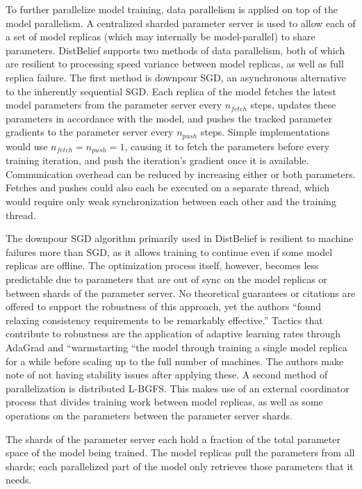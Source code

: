 To further parallelize model training, data parallelism is applied on top of the model parallelism. A centralized sharded parameter server is used to allow each of a set of model replicas (which may internally be model-parallel) to share parameters. DistBelief supports two methods of data parallelism, both of which are resilient to processing speed variance between model replicas, as well as full replica failure. The first method is downpour SGD, an asynchronous alternative to the inherently sequential SGD. Each replica of the model fetches the latest model parameters from the parameter server every $n_{fetch}$ steps, updates these parameters in accordance with the model, and pushes the tracked parameter gradients to the parameter server every $n_{push}$ steps. Simple implementations would use $n_{fetch} = n_{push} = 1$, causing it to fetch the parameters before every training iteration, and push the iteration’s gradient once it is available. Communication overhead can be reduced by increasing either or both parameters. Fetches and pushes could also each be executed on a separate thread, which would require only weak synchronization between each other and the training thread.

The downpour SGD algorithm primarily used in DistBelief is resilient to machine failures more than SGD, as it allows training to continue even if some model replicas are offline. The optimization process itself, however, becomes less predictable due to parameters that are out of sync on the model replicas or between shards of the parameter server. No theoretical guarantees or citations are offered to support the robustness of this approach, yet the authors “found relaxing consistency requirements to be remarkably effective.” Tactics that contribute to robustness are the application of adaptive learning rates through AdaGrad\citep{Duchi2011} and “warmstarting “the model through training a single model replica for a while before scaling up to the full number of machines. The authors make note of not having stability issues after applying these.
A second method of parallelization is distributed L-BGFS. This makes use of an external coordinator process that divides training work between model replicas, as well as some operations on the parameters between the parameter server shards.

The shards of the parameter server each hold a fraction of the total parameter space of the model being trained. The model replicas pull the parameters from all shards; each parallelized part of the model only retrieves those parameters that it needs.

